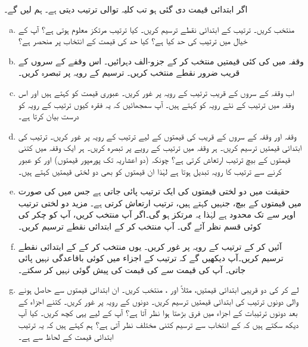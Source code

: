 اگر ابتدائی قیمت  دی گئی ہو تب کلیہ توالی  ترتیب  دیتی ہے۔  ہم  لیں گے۔
\begin{enumerate}[a.]
\item
{} منتخب کریں۔ ترتیب کے ابتدائی  نقطے  ترسیم کریں۔ کیا ترتیب مرتکز  معلوم ہوتی  ہے؟ آپ کے خیال میں ترتیب کی حد کیا ہے؟ کیا حد کی قیمت  کے انتخاب پر منحصر ہے؟
\item
وقفہ  میں  کی کئی قیمتیں منتخب کر کے جزو-الف دہرائیں۔ اس وقفے  کے سروں کے قریب ضرور نقطے منتخب کریں۔ ترسیم کے رویہ پر تبصرہ کریں۔
\item
اب وقفہ  کے   سروں کے قریب ترتیب کے رویہ پر غور کریں۔ عبوری قیمت  کو   کہتے ہیں اور اس   وقفہ میں ترتیب کے  نئے رویہ کو   کہتے ہیں۔ آپ سمجھائیں کہ یہ فقرہ کیوں ترتیب کے رویہ کو درست بیان کرتا ہے۔
\item
وقفہ  اور وقفہ  کے  سروں کے قریب   کی قیمتوں کے لیے ترتیب کے رویہ پر غور کریں۔ ترتیب کی ابتدائی  قیمتیں ترسیم کریں۔ ہر   وقفہ میں ترتیب کے رویے  پر تبصرہ کریں۔ ہر ایک وقفہ میں کتنی قیمتوں کے بیچ ترتیب  ارتعاش کرتی ہے؟ چونکہ (دو اعشاریہ تک پورمپور قیمتوں)    اور   کو عبور کرنے سے ترتیب کا رویہ تبدیل ہوتا ہے لہٰذا ان قیمتوں کو بھی دو لختی قیمتیں کہتے ہیں۔ 
\item
حقیقت میں دو لختی قیمتوں کی ایک  ترتیب  پائی جاتی ہے جس میں   کی صورت میں     قیمتوں کے بیچ، جنہیں
  کہتے ہیں،      ترتیب     ارتعاش کرتی ہے۔ مزید دو لختی ترتیب  اوپر سے  تک محدود ہے لہٰذا یہ مرتکز ہو گی۔اگر آپ  منتخب کریں، آپ کو  چکر کی کوئی قسم نظر آئے گی۔ آپ  منتخب کر کے ابتدائی  نقطے ترسیم کریں۔
\item
آئیں  کر کے ترتیب کے رویہ پر غور کریں۔ یوں  منتخب کر کے  کے ابتدائی  نقطے ترسیم کریں۔آپ دیکھیں گے کہ ترتیب کے   اجزاء میں کوئی باقاعدگی نہیں پائی جاتی۔ آپ  کی قیمت سے  کی قیمت کی پیش گوئی نہیں کر سکتے۔
\item
{} لے کر  کی دو قریبی ابتدائی قیمتیں، مثلاً  اور ، منتخب کریں۔ ان ابتدائی قیمتوں سے حاصل ہونے والی  دونوں  ترتیب کی ابتدائی  قیمتیں ترسیم کریں۔ دونوں کے رویہ پر غور کریں۔ کتنے اجزاء  کے بعد دونوں ترتیبات کے اجزاء میں فرق بڑھتا ہوا نظر آتا ہے؟ آپ  کے لیے یہی کچھ کریں۔ کیا آپ دیکھ سکتے ہیں کہ  کے انتخاب سے ترسیم کتنی  مختلف نظر آتی ہے؟ ہم کہتے ہیں کہ یہ ترتیب ابتدائی قیمت کے لحاظ سے  ہے۔
\end{enumerate}                                                    

